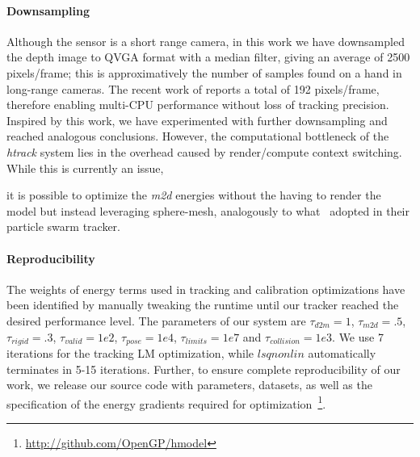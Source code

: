\paragraph{Downsampling}
Although the \realsense{} sensor is a short range camera, in this work we have downsampled the depth image to QVGA format with a median filter, giving an average of 2500 pixels/frame; this is approximatively the number of samples found on a hand in long-range cameras. The recent work of \cite{taylor2016concerto} reports a total of 192 pixels/frame, therefore enabling multi-CPU performance without loss of tracking precision. Inspired by this work, we have experimented with further downsampling and reached analogous conclusions. However, the computational bottleneck of the \emph{htrack} system lies in the overhead caused by render/compute context switching. While this is currently an issue, 
\begin{draft}
it is possible to optimize the \emph{m2d} energies without the having to render the model but instead leveraging sphere-mesh, analogously to what~\cite{qian2014realtime} adopted in their particle swarm tracker.
\end{draft}

\paragraph{Reproducibility}
% 
The weights of energy terms used in tracking and calibration optimizations have been identified by manually tweaking the runtime until our tracker reached the desired performance level. 
The parameters of our system are $\tau_{d2m}=1$, $\tau_{m2d}=.5$, $\tau_{rigid}=.3$, $\tau_{valid}=1e2$, $\tau_{pose}=1e4$, $\tau_{limits}=1e7$ and $\tau_{collision}=1e3$. We use 7 iterations for the tracking LM optimization, while $lsqnonlin$ automatically terminates in 5-15 iterations. Further, to ensure complete reproducibility of our work, we release our source code with parameters, datasets, as well as the specification of the energy gradients required for optimization~\footnote{\url{http://github.com/OpenGP/hmodel}}.